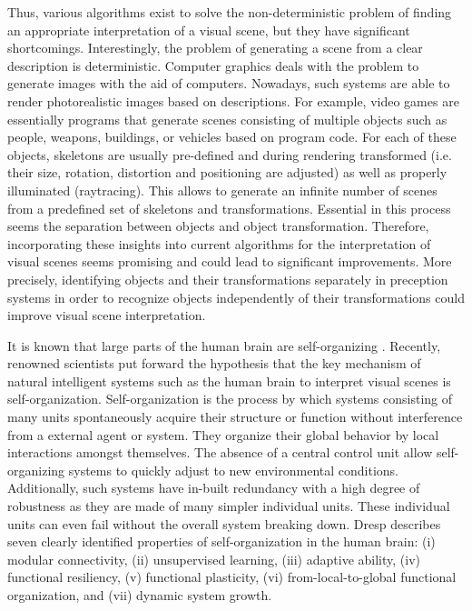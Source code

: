 Thus, various algorithms exist to solve the non-deterministic problem of finding an appropriate interpretation of a visual scene, but they have significant shortcomings.
Interestingly, the problem of generating a scene from a clear description is deterministic.
Computer graphics deals with the problem to generate images with the aid of computers.
Nowadays, such systems are able to render photorealistic images based on descriptions.
For example, video games are essentially programs that generate scenes consisting of multiple objects such as people, weapons, buildings, or vehicles based on program code.
For each of these objects, skeletons are usually pre-defined and during rendering transformed (i.e. their size, rotation, distortion and positioning are adjusted) as well as properly illuminated (raytracing).
This allows to generate an infinite number of scenes from a predefined set of skeletons and transformations.
Essential in this process seems the separation between objects and object transformation.
Therefore, incorporating these insights into current algorithms for the interpretation of visual scenes seems promising and could lead to significant improvements.
More precisely, identifying objects and their transformations separately in preception systems in order to recognize objects independently of their transformations could improve visual scene interpretation.

It is known that large parts of the human brain are self-organizing .
Recently, renowned scientists  put forward the hypothesis that the key mechanism of natural intelligent systems such as the human brain to interpret visual scenes is self-organization.
Self-organization is the process by which systems consisting of many units spontaneously acquire their structure or function without interference from a external agent or system.
They organize their global behavior by local interactions amongst themselves.
The absence of a central control unit allow self-organizing systems to quickly adjust to new environmental conditions.
Additionally, such systems have in-built redundancy with a high degree of robustness as they  are made of many simpler individual units.
These individual units can even fail without the overall system breaking down.
Dresp  describes seven clearly identified properties of self-organization in the human brain: (i) modular connectivity, (ii) unsupervised learning, (iii) adaptive ability, (iv) functional resiliency, (v) functional plasticity, (vi) from-local-to-global functional organization, and (vii) dynamic system growth.

